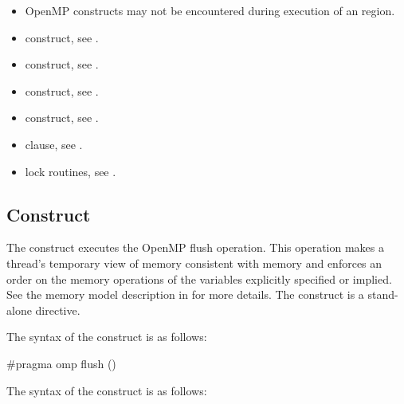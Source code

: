 {{{{\begin{itemize}
\item OpenMP constructs may not be encountered during execution of an
 region.
\end{itemize}

\crossreferences
\begin{itemize}
\item {} construct, see 
. 

\item {} construct, see 
.

\item {} construct, see 
.

\item {} construct, see 
.

\item {} clause, see 
.

\item lock routines, see 
.
\end{itemize}









\subsection{ Construct}
\label{subsec:flush Construct}
\summary
The  construct executes the OpenMP flush operation. This operation makes a 
thread’s temporary view of memory consistent with memory and enforces an order on 
the memory operations of the variables explicitly specified or implied. See the memory 
model description in  for more details. The  construct is a 
stand-alone directive.

\syntax
\ccppspecificstart
The syntax of the  construct is as follows:

\begin{boxedcode}
\#pragma omp flush \plc{[}()\plc{] new-line}
\end{boxedcode}
\ccppspecificend

\fortranspecificstart
The syntax of the  construct is as follows:

}}}}
